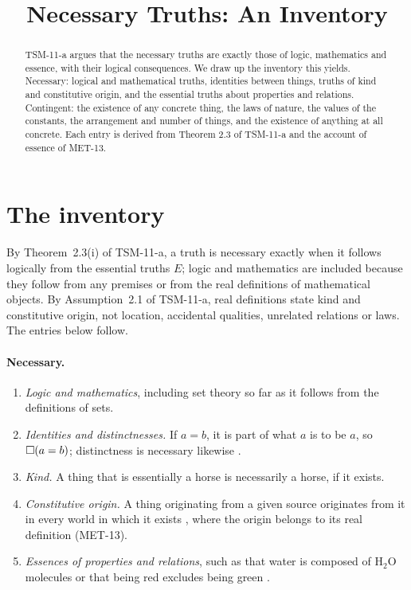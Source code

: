 \documentclass{situationist-preprint}
\title{Necessary Truths: An Inventory}
\begin{document}
\maketitle

\begin{abstract}
TSM-11-a argues that the necessary truths are exactly those of logic, mathematics and essence, with their logical consequences. We draw up the inventory this yields. Necessary: logical and mathematical truths, identities between things, truths of kind and constitutive origin, and the essential truths about properties and relations. Contingent: the existence of any concrete thing, the laws of nature, the values of the constants, the arrangement and number of things, and the existence of anything at all concrete. Each entry is derived from Theorem 2.3 of TSM-11-a and the account of essence of MET-13.
\end{abstract}

\section{The inventory}

By Theorem~2.3(i) of TSM-11-a, a truth is necessary exactly when it follows logically from the essential truths $E$; logic and mathematics are included because they follow from any premises or from the real definitions of mathematical objects. By Assumption~2.1 of TSM-11-a, real definitions state kind and constitutive origin, not location, accidental qualities, unrelated relations or laws. The entries below follow.

\paragraph{Necessary.}
\begin{enumerate}
\item \emph{Logic and mathematics}, including set theory so far as it follows from the definitions of sets.
\item \emph{Identities and distinctnesses.} If $a = b$, it is part of what $a$ is to be $a$, so $\mathord{\Box}(a = b)$; distinctness is necessary likewise \citep{Kripke1980}.
\item \emph{Kind.} A thing that is essentially a horse is necessarily a horse, if it exists.
\item \emph{Constitutive origin.} A thing originating from a given source originates from it in every world in which it exists \citep{Kripke1980}, where the origin belongs to its real definition (MET-13).
\item \emph{Essences of properties and relations}, such as that water is composed of H$_2$O molecules or that being red excludes being green \citep{Fine1994}.
\end{enumerate}
\end{document}
